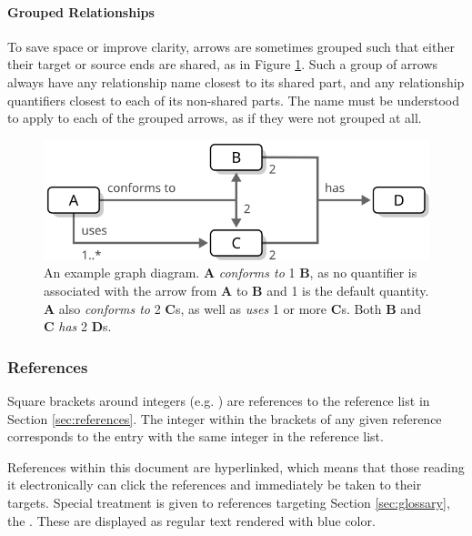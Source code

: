 \paragraph{Grouped Relationships}
To save space or improve clarity, arrows are sometimes grouped such that either their target or source ends are shared, as in Figure \ref{fig:graph-diagram}.
Such a group of arrows always have any relationship name closest to its shared part, and any relationship quantifiers closest to each of its non-shared parts.
The name must be understood to apply to each of the grouped arrows, as if they were not grouped at all.

\vfill

\begin{figure}[ht!]
  \centering
  \includegraphics[scale=0.9]{figures/graph-diagram}
  \caption{
    An example graph diagram.
    \textbf{A} \textit{conforms to} 1 \textbf{B}, as no quantifier is associated with the arrow from \textbf{A} to \textbf{B} and 1 is the default quantity.
    \textbf{A} also \textit{conforms to} 2 \textbf{C}s, as well as \textit{uses} 1 or more \textbf{C}s.
    Both \textbf{B} and \textbf{C} \textit{has} 2 \textbf{D}s.
  }
  \label{fig:graph-diagram}
\end{figure}

\subsubsection{References}

Square brackets around integers (e.g. \cite{delsing2017iot}) are references to the reference list in Section \ref{sec:references}.
The integer within the brackets of any given reference corresponds to the entry with the same integer in the reference list.

References within this document are hyperlinked, which means that those reading it electronically can click the references and immediately be taken to their targets.
Special treatment is given to references targeting Section \ref{sec:glossary}, the .
These are displayed as regular text rendered with blue color.


